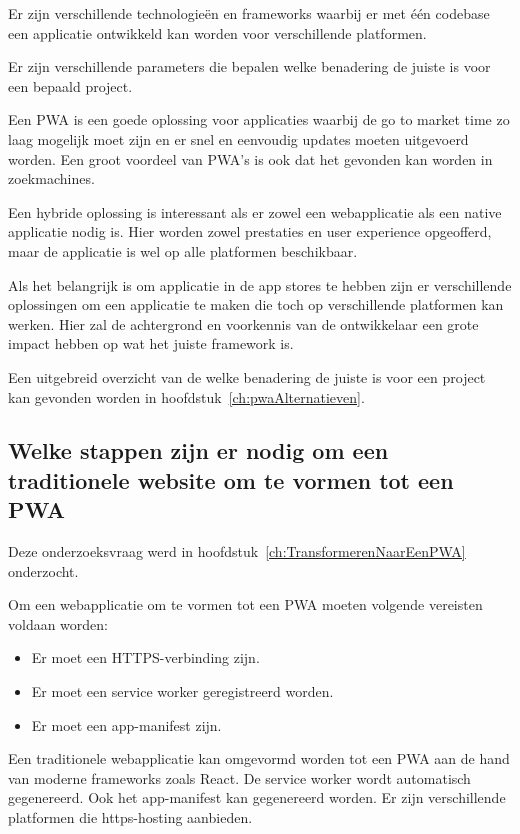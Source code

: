 		Er zijn verschillende technologieën en frameworks waarbij er met één codebase een applicatie ontwikkeld kan worden voor verschillende platformen. 
		
		Er zijn verschillende parameters die bepalen welke benadering de juiste is voor een bepaald project. 
	
		Een PWA is een goede oplossing voor applicaties waarbij de go to market time zo laag mogelijk moet zijn en er snel en eenvoudig updates moeten uitgevoerd worden. Een groot voordeel van PWA's is ook dat het gevonden kan worden in zoekmachines.
		
		Een hybride oplossing is interessant als er zowel een webapplicatie als een native applicatie nodig is. Hier worden zowel prestaties en user experience opgeofferd, maar de applicatie is wel op alle platformen beschikbaar. 
		
		Als het belangrijk is om applicatie in de app stores te hebben zijn er verschillende oplossingen om een applicatie te maken die toch op verschillende platformen kan werken. Hier zal de achtergrond en voorkennis van de ontwikkelaar een grote impact hebben op wat het juiste framework is. 
		
		Een uitgebreid overzicht van de welke benadering de juiste is voor een project kan gevonden worden in hoofdstuk~\ref{ch:pwaAlternatieven}.
	
	\subsection{Welke stappen zijn er nodig om een traditionele website om te vormen tot een PWA}
		
		Deze onderzoeksvraag werd in hoofdstuk~\ref{ch:TransformerenNaarEenPWA} onderzocht. 
		
		Om een webapplicatie om te vormen tot een PWA moeten volgende vereisten voldaan worden:
		\begin{itemize}
			\item	Er moet een HTTPS-verbinding zijn.
			\item	Er moet een service worker geregistreerd worden.
			\item	Er moet een app-manifest zijn.
		\end{itemize}
		
		Een traditionele webapplicatie kan omgevormd worden tot een PWA aan de hand van moderne frameworks zoals React. 
		De service worker wordt automatisch gegenereerd. Ook het app-manifest kan gegenereerd worden. Er zijn verschillende platformen die https-hosting aanbieden. 
		
